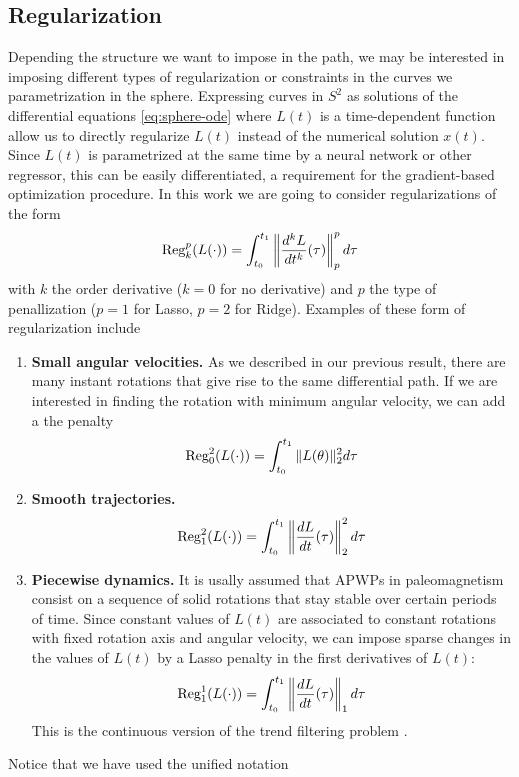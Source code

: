 \subsection{Regularization}

Depending the structure we want to impose in the path, we may be interested in imposing different types of regularization or constraints in the curves we parametrization in the sphere. 
Expressing curves in $S^2$ as solutions of the differential equations \eqref{eq:sphere-ode} where $L(t)$ is a time-dependent function allow us to directly regularize $L(t)$ instead of the numerical solution $x(t)$. 
Since $L(t)$ is parametrized at the same time by a neural network or other regressor, this can be easily differentiated, a requirement for the gradient-based optimization procedure.
In this work we are going to consider regularizations of the form 
\begin{equation}
    \operatorname{\text{Reg}}_k^p (L(\cdot))
    = 
    \int_{t_0}^{t_1} \left \| \frac{d^k L}{dt^k} (\tau) \right \|_p^p d\tau
\end{equation}
with $k$ the order derivative ($k=0$ for no derivative) and $p$ the type of penallization ($p=1$ for Lasso, $p=2$ for Ridge).
Examples of these form of regularization include
\begin{enumerate}
    \item \textbf{Small angular velocities.} As we described in our previous result, there are many instant rotations that give rise to the same differential path. If we are interested in finding the rotation with minimum angular velocity, we can add a the penalty
    \begin{equation}
        \operatorname{\text{Reg}}_0^2 (L(\cdot)) = \int_{t_0}^{t_1} \| L(\theta) \|_2^2 d\tau
    \end{equation}
    \item \textbf{Smooth trajectories.}
    \begin{equation}
        \operatorname{\text{Reg}}_1^2 (L(\cdot)) = \int_{t_0}^{t_1} \left \| \frac{dL}{dt}(\tau) \right \|_2^2 d\tau
    \end{equation}
    \item \textbf{Piecewise dynamics. } It is usally assumed that APWPs in paleomagnetism consist on a sequence of solid rotations that stay stable over certain periods of time. Since constant values of $L(t)$ are associated to constant rotations with fixed rotation axis and angular velocity, we can impose sparse changes in the values of $L(t)$ by a Lasso penalty in the first derivatives of $L(t)$:
    \begin{equation}
        \operatorname{\text{Reg}}_1^1 (L(\cdot)) = \int_{t_0}^{t_1} \left \| \frac{dL}{dt}(\tau) \right \|_1 d\tau
    \end{equation}
    This is the continuous version of the trend filtering problem \cite{tibs-trend-filter}.
\end{enumerate}
Notice that we have used the unified notation 

